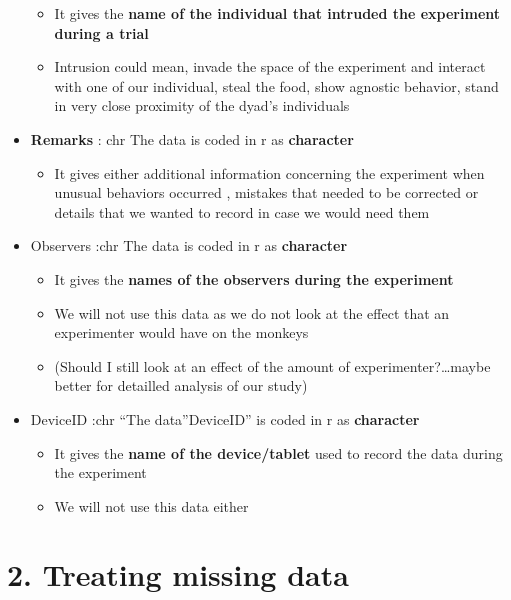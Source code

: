 \documentclass[
]{article}
\providecommand{\tightlist}{%
  \setlength{\itemsep}{0pt}\setlength{\parskip}{0pt}}
\begin{document}
\begin{itemize}
  \begin{itemize}
  \tightlist
  \item
    It gives the \textbf{name of the individual that intruded the
    experiment during a trial}
  \item
    Intrusion could mean, invade the space of the experiment and
    interact with one of our individual, steal the food, show agnostic
    behavior, stand in very close proximity of the dyad's individuals
  \end{itemize}
\item
  \textbf{Remarks} : chr The data is coded in r as \textbf{character}

  \begin{itemize}
  \tightlist
  \item
    It gives either additional information concerning the experiment
    when unusual behaviors occurred , mistakes that needed to be
    corrected or details that we wanted to record in case we would need
    them
  \end{itemize}
\item
  Observers :chr The data is coded in r as \textbf{character}

  \begin{itemize}
  \tightlist
  \item
    It gives the \textbf{names of the observers during the experiment}
  \item
    We will not use this data as we do not look at the effect that an
    experimenter would have on the monkeys
  \item
    (Should I still look at an effect of the amount of
    experimenter?\ldots maybe better for detailled analysis of our
    study)
  \end{itemize}
\item
  DeviceID :chr ``The data''DeviceID'' is coded in r as
  \textbf{character}

  \begin{itemize}
  \tightlist
  \item
    It gives the \textbf{name of the device/tablet} used to record the
    data during the experiment
  \item
    We will not use this data either
  \end{itemize}
\end{itemize}

\hypertarget{treating-missing-data}{%
\section{2. Treating missing data}\label{treating-missing-data}}
\end{document}
